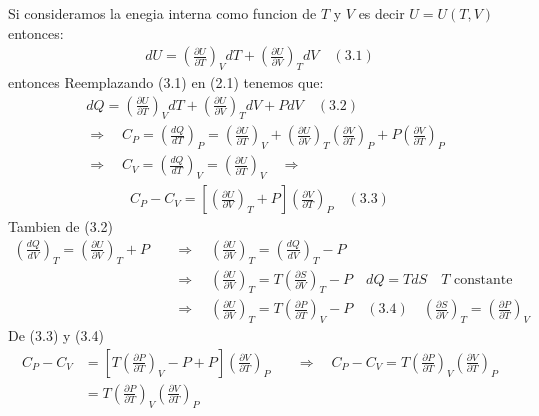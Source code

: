 \documentclass[a4paper]{article}
\begin{document}
    \begin{answer}[Punto 3]
    Si consideramos la enegia interna como funcion de $T$ y $V$ es decir $U = U(T,V)$ entonces:
    \begin{align*}
        dU = \left( \frac{\partial U}{\partial T} \right)_V dT + \left( \frac{\partial U}{\partial V} \right)_T dV \quad (3.1)
    \end{align*}
    entonces Reemplazando (3.1) en (2.1) tenemos que:
    \begin{align*}
        &dQ = \left( \frac{\partial U}{\partial T} \right)_V dT + \left( \frac{\partial U}{\partial V} \right)_T dV + PdV \quad (3.2)\quad\\ 
        &\Rightarrow \quad  C_P = \left( \frac{dQ}{dT} \right)_P = \left( \frac{\partial U}{\partial T} \right)_V + \left( \frac{\partial U}{\partial V} \right)_T \left( \frac{\partial V}{\partial T} \right)_P + P \left( \frac{\partial V}{\partial T} \right)_P\\
        &\Rightarrow \quad C_V = \left( \frac {dQ}{dT} \right)_V = \left( \frac{\partial U}{\partial T} \right)_V \quad \Rightarrow
    \end{align*}
    \begin{align*}
        C_P - C_V = \left[ \left( \frac{\partial U}{\partial V} \right)_T + P \right] \left( \frac{\partial V}{\partial T} \right)_P \quad (3.3)
    \end{align*}
    Tambien de (3.2)
    \begin{align*}
        \left(\frac{dQ}{dV}\right)_T = \left( \frac{\partial U}{\partial V} \right)_T + P \quad &\Rightarrow \quad \left( \frac{\partial U}{\partial V} \right)_T = \left(\frac{dQ}{dV}\right)_T - P\\
        &\Rightarrow \quad \left( \frac{\partial U}{\partial V} \right)_T = T \left( \frac{\partial S}{\partial V} \right)_T - P \quad dQ = TdS \quad \text{$T$ constante}\\
        &\Rightarrow \quad \left( \frac{\partial U}{\partial V} \right)_T = T\left( \frac{\partial P}{\partial T} \right)_V - P \quad (3.4) \quad \text{$\left( \frac{\partial S}{\partial V} \right)_T = \left( \frac{\partial P}{\partial T} \right)_V$}
    \end{align*}
    De (3.3) y (3.4)
    \begin{align*}
        C_P - C_V &= \left[ T\left( \frac{\partial P}{\partial T} \right)_V - P + P \right] \left( \frac{\partial V}{\partial T} \right)_P \quad &\Rightarrow \quad C_P - C_V = T\left( \frac{\partial P}{\partial T} \right)_V \left( \frac{\partial V}{\partial T} \right)_P\\
        &=T \left( \frac{\partial P}{\partial T} \right)_V \left( \frac{\partial V}{\partial T} \right)_P \\
     \end{align*}
    

\end{answer}
\end{document}
